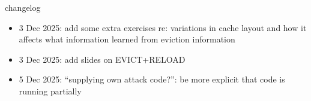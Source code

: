\date{}
\title{}
\date{}
\usepackage{pdfpages}

\begin{frame}
    \titlepage
\end{frame}

{\changelogmode
\begin{frame}{changelog}
\begin{itemize}
\item 3 Dec 2025: add some extra exercises re: variations in cache layout and how it affects what information learned from eviction information
\item 3 Dec 2025: add slides on EVICT+RELOAD
\item 5 Dec 2025: ``supplying own attack code?'': be more explicit that code is running partially
\end{itemize}
\end{frame}
}








